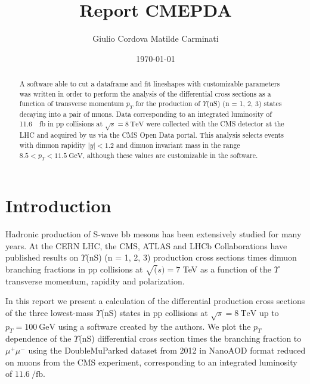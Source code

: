 \documentclass[a4paper,11pt]{article}
\title{Report CMEPDA}
\author{Giulio Cordova \qquad Matilde Carminati}
\date{\today}
\begin{document}
\pagestyle{fancy}
\fancyhead{} %
\fancyfoot{} %
\fancyfoot[CO,RE]{\thepage}
\maketitle
\begin{abstract}
    A software able to cut a dataframe and fit lineshapes with customizable parameters was written in order to perform the analysis of the differential cross sections as a function of transverse momentum $p_T$ for the production of $\Upsilon$(nS) (n = 1, 2, 3) states decaying into a pair of muons. Data corresponding to an integrated luminosity of \SI{11.6}{\per\femto\barn} in pp collisions at $\sqrt{s} = \SI{8}{\tera\eV}$ were collected with the CMS detector at the LHC and acquired by us via the CMS Open Data portal. This analysis selects events with dimuon rapidity $|y| < 1.2$ and dimuon invariant mass in the range $8.5 < p_T < \SI{11.5}{\giga\eV}$, although these values are customizable in the software.

\end{abstract}
\section{Introduction}
Hadronic production of S-wave bb mesons has been extensively studied for many years. 
At the CERN LHC, the CMS, ATLAS and LHCb Collaborations have published results on $\Upsilon$(nS) (n = 1, 2, 3) production cross sections times dimuon branching fractions in pp collisions at $\sqrt(s)=7$ TeV as a function of the $\Upsilon$ transverse momentum, rapidity and polarization.

In this report we present a calculation of the differential production cross sections of the three lowest-mass $\Upsilon$(nS) states in pp collisions at $\sqrt{s}=\SI{8}{\tera\eV}$ up to $p_T = \SI{100}{\giga\eV}$ using a software created by the authors. 
We plot the $p_T$ dependence of the $\Upsilon$(nS) differential cross section times the branching fraction to $\mu^+\mu^-$ using the DoubleMuParked dataset from 2012 in NanoAOD format reduced on muons\cite{dataA} from the CMS experiment, corresponding to an integrated luminosity of $\SI{11.6}{\per\femto\barn}$. 
\end{document}
